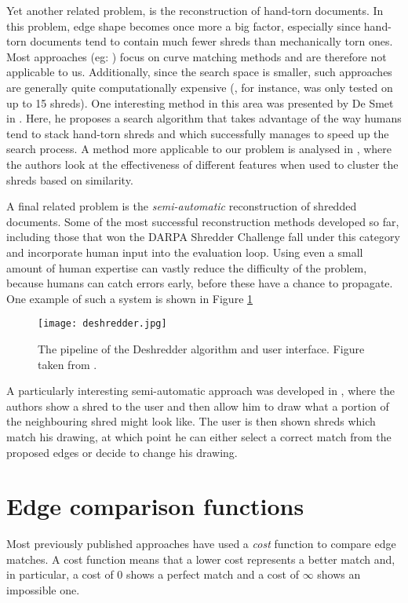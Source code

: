 Yet another related problem, is the reconstruction of hand-torn documents. In this problem, edge shape becomes once more a big factor, especially since hand-torn documents tend to contain much fewer shreds than mechanically torn ones. Most approaches (eg: \cite{P18,P27,P31}) focus on curve matching methods and are therefore not applicable to us. Additionally, since the search space is smaller, such approaches are generally quite computationally expensive (\cite{P18}, for instance, was only tested on up to 15 shreds). One interesting method in this area was presented by De Smet in \cite{P30}. Here, he proposes a search algorithm that takes advantage of the way humans tend to stack hand-torn shreds and which successfully manages to speed up the search process. A method more applicable to our problem is analysed in \cite{P32}, where the authors look at the effectiveness of different features when used to cluster the shreds based on similarity.

A final related problem is the \emph{semi-automatic} reconstruction of shredded documents. Some of the most successful reconstruction methods developed so far, including those that won the DARPA Shredder Challenge \cite{P33,P34} fall under this category and incorporate human input into the evaluation loop. Using even a small amount of human expertise can vastly reduce the difficulty of the problem, because humans can catch errors early, before these have a chance to propagate. One example of such a system is shown in Figure \ref{fig:deshredder}

\begin{figure}[h]
    \centering
    \texttt{[image: deshredder.jpg]}
    \caption{The pipeline of the Deshredder algorithm and user interface. Figure taken from \cite{P34}.}
    \label{fig:deshredder}
\end{figure}

A particularly interesting semi-automatic approach was developed in \cite{P35}, where the authors show a shred to the user and then allow him to draw what a portion of the neighbouring shred might look like. The user is then shown shreds which match his drawing, at which point he can either select a correct match from the proposed edges or decide to change his drawing.

\clearpage

\section{Edge comparison functions}
Most previously published approaches have used a \emph{cost} function to compare edge matches. A cost function means that a lower cost represents a better match and, in particular, a cost of $0$ shows a perfect match and a cost of $\infty$ shows an impossible one. 

